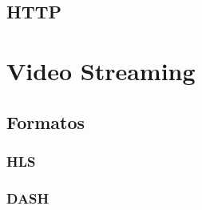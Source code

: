 \subsection{HTTP}

\section{Video Streaming}

\subsection{Formatos}

\subsubsection{HLS}

\subsubsection{DASH}
